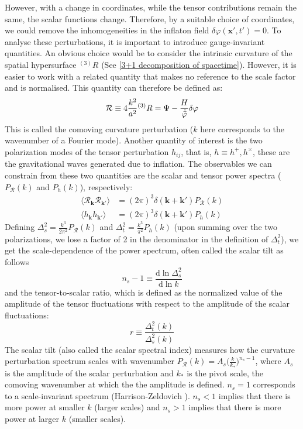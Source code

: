 \documentclass[aps,prd,reprint,preprintnumbers,showpacs,floatfix,nofootinbib,superscript address]{revtex4-2}
\newcommand{\wb}[1]{{\color[RGB]{255,0,0}{\textbf{\textit{[WB: #1]}}}}}
\begin{document}
However, with a change in coordinates, while the tensor contributions remain the same, the scalar functions change. Therefore, by a suitable choice of coordinates, we could remove the inhomogeneities in the inflaton field $\delta \varphi(\textbf{x}',t') = 0$. To analyse these perturbations, it is important to introduce gauge-invariant quantities. An obvious choice would be to consider the intrinsic curvature of the spatial hypersurface ${}^{(3)}R$ (See \cref{3+1 decomposition of spacetime}). However, it is easier to work with a related quantity that makes no reference to the scale factor and is normalised. This quantity can therefore be defined as:
\begin{equation} \label{comoving curvature perurbation}
    \mathcal{R} \equiv 4 \frac{k^2}{a^2} {}^{(3)}R = \Psi - \frac{H}{\dot{\Bar{\varphi}}}\delta \varphi
\end{equation}
This is called the comoving curvature perturbation ($k$ here corresponds to the wavenumber of a Fourier mode). Another quantity of interest is the two polarization modes of the tensor perturbation $h_{ij}$, that is, $h \equiv h^+ , h^\times$, these are the gravitational waves generated due to inflation. The observables we can constrain from these two quantities are the scalar and tensor power spectra ($P_\mathcal{R}(k)$ and $P_h(k)$), respectively:\wb{Define bold $k$?}
\begin{align}
    \langle \mathcal{R}_{\bm{k}} \mathcal{R}_{\bm{k}'} \rangle &= (2\pi)^3 \delta(\bm{k}+\bm{k}')P_\mathcal{R}(k) \\
    \langle h_{\bm{k}} h_{\bm{k}'} \rangle &= (2\pi)^3 \delta(\bm{k}+\bm{k}')P_h(k)
\end{align}
Defining $\Delta_s^2 = \frac{k^3}{2\pi^2} P_\mathcal{R}(k)$ and $\Delta_t^2 = \frac{k^3}{\pi^2} P_h(k)$ (upon summing over the two polarizations, we lose a factor of 2 in the denominator in the definition of $\Delta_t^2$), we get the scale-dependence of the power spectrum, often called the scalar tilt as follows
\begin{equation}
    n_s - 1 \equiv \frac{\text{d} \ln \Delta_s^2}{\text{d} \ln k}
\end{equation}
and the tensor-to-scalar ratio, which is defined as the normalized value of the amplitude of the tensor fluctuations with respect to the amplitude of the scalar fluctuations:
\begin{equation}
    r \equiv \frac{\Delta_t^2(k)}{\Delta_s^2(k)}
\end{equation}
The scalar tilt (also called the scalar spectral index) measures how the curvature perturbation spectrum scales with wavenumber $P_\mathcal{R}(k) = A_s\big(\frac{k}{k_*}\big)^{n_s-1}$, where $A_s$ is the amplitude of the scalar perturbation and $k_*$ is the pivot scale, the comoving wavenumber at which the the amplitude is defined. $n_s = 1$ corresponds to a scale-invariant spectrum (Harrison‑Zeldovich \cite{harrison_fluctuations_1970, zeldovich_hypothesis_1972, peebles_primeval_1970}). $n_s < 1$ implies that there is more power at smaller $k$ (larger scales) and $n_s > 1$ implies that there is more power at larger $k$ (smaller scales). 
\end{document}
